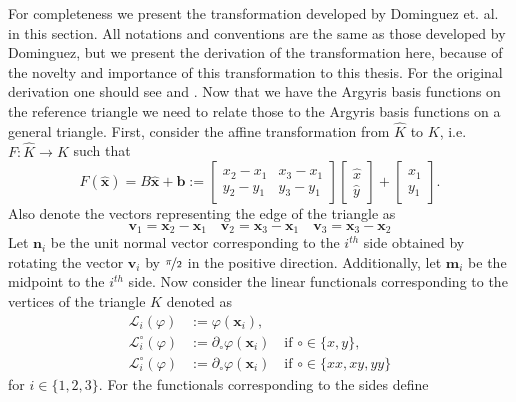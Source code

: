 For completeness we present the transformation developed by Dominguez et. al. in
this section. All notations and conventions are the same as those developed by
Dominguez, but we present the derivation of the transformation here, because of
the novelty and importance of this transformation to this thesis. For the
original derivation one should see \cite{Dominguez06} and \cite{Dominguez08}.
Now that we have the Argyris basis functions on the reference triangle we need
to relate those to the Argyris basis functions on a general triangle. First,
consider the affine transformation from $\hat{K}$ to $K$, i.e. $F: \hat{K} \to
K$ such that
\begin{equation}
  F(\hat{\mathbf{x}}) = B\hat{\mathbf{x}} + \mathbf{b} :=
  \begin{bmatrix}
    x_2 - x_1 & x_3 - x_1 \\ y_2 - y_1 & y_3 - y_1
  \end{bmatrix} \begin{bmatrix}
    \hat{x} \\ \hat{y}
  \end{bmatrix} + \begin{bmatrix}
    x_1 \\ y_1
  \end{bmatrix}.
  \label{eqn:Affine}
\end{equation}
Also denote the vectors representing the edge of the triangle as
\begin{equation*}
  \mathbf{v}_1 = \mathbf{x}_2 - \mathbf{x}_1\quad \mathbf{v}_2 = \mathbf{x}_3 -
  \mathbf{x}_1\quad \mathbf{v}_3 = \mathbf{x}_3 - \mathbf{x}_2
\end{equation*}
Let $\mathbf{n}_i$ be the unit normal vector corresponding to the $i^{th}$ side
obtained by rotating the vector $\mathbf{v}_i$ by $\nicefrac{\pi}{2}$ in the
positive direction. Additionally, let $\mathbf{m}_i$ be the midpoint to the
$i^{th}$ side.  Now consider the linear functionals corresponding to the
vertices of the triangle $K$ denoted as
\begin{align*}
  \mathcal{L}_i(\varphi) &:= \varphi(\mathbf{x}_i), \\
  \mathcal{L}_i^\circ(\varphi) &:= \partial_\circ \varphi(\mathbf{x}_i) \quad
  \text{if }\circ \in
    \{x,y\}, \\
  \mathcal{L}_i^\circ(\varphi) &:= \partial_\circ \varphi(\mathbf{x}_i) \quad
  \text{if }\circ \in
    \{xx,xy,yy\}
\end{align*}
for $i\in \{1,2,3\}$. For the functionals corresponding to the sides define
